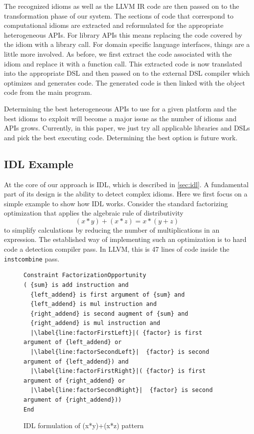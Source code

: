     The recognized idioms as well as the LLVM IR code are then passed on
    to the transformation phase of our system.  The sections of code that
    correspond to computational idioms are extracted and reformulated for
    the appropriate heterogeneous APIs.  For library  APIs this means replacing
    the code covered by the idiom with a library call. 
    For domain specific language interfaces,
    things are a little more involved. As before, we first extract the code
    associated with the idiom and replace it with a function call. This
    extracted code is now translated into the appropriate DSL and then
    passed on to the external DSL compiler which optimizes and generates
    code. The generated code is then linked
    with the object code from the main program.

    Determining the best heterogeneous APIs to use for a given platform
    and the best idioms to exploit will become a major issue as the number
    of idioms and APIs grows.  Currently, in this paper, we just try all
    applicable libraries and DSLs and pick the best executing
    code. Determining the best option is future work.

\subsection{IDL Example}

    At the core of our approach is IDL, which is described in \autoref{sec:idl}.
    A fundamental part of its design is the
    ability to detect  complex idioms.  Here we first focus on a simple example
    to show how IDL works.  Consider the standard factorizing
    optimization that applies the algebraic rule of distributivity
    \[(x*y)+(x*z) = x*(y+z)\]
    to simplify calculations by reducing the number of multiplications in an
    expression.
    The established way of implementing such an optimization is to hard code a
    detection compiler pass.
    In LLVM, this is 47 lines of code inside the \texttt{instcombine} pass.

\begin{figure}[t]
\begin{lstlisting}[language={constraints},escapechar=|,basicstyle=\linespread{1.133}\scriptsize\ttfamily]
Constraint FactorizationOpportunity
( {sum} is add instruction and
  {left_addend} is first argument of {sum} and
  {left_addend} is mul instruction and
  {right_addend} is second augment of {sum} and
  {right_addend} is mul instruction and
  |\label{line:factorFirstLeft}|( {factor} is first argument of {left_addend} or
  |\label{line:factorSecondLeft}|  {factor} is second argument of {left_addend}) and
  |\label{line:factorFirstRight}|( {factor} is first argument of {right_addend} or
  |\label{line:factorSecondRight}|  {factor} is second argument of {right_addend}))
End
\end{lstlisting}
\vspace{-0.3cm}
\caption{IDL formulation of (x*y)+(x*z) pattern}
\label{fig:IDLfactorization}
\end{figure}

